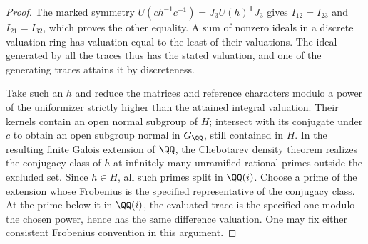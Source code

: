 \documentclass[a4paper,11pt]{article}
\theoremstyle{definition}
\theoremstyle{remark}
\numberwithin{equation}{section}
\begin{document}
\begin{proof}
The marked symmetry \(U(ch^{-1}c^{-1})=J_3 U(h)^{\mathsf T}J_3\) gives \(I_{12}=I_{23}\) and \(I_{21}=I_{32}\), which proves the other equality. A sum of nonzero ideals in a discrete valuation ring has valuation equal to the least of their valuations. The ideal generated by all the traces thus has the stated valuation, and one of the generating traces attains it by discreteness.

Take such an \(h\) and reduce the matrices and reference characters modulo a power of the uniformizer strictly higher than the attained integral valuation. Their kernels contain an open normal subgroup of \(H\); intersect with its conjugate under \(c\) to obtain an open subgroup normal in \(G_\QQ\), still contained in \(H\). In the resulting finite Galois extension of \(\QQ\), the Chebotarev density theorem realizes the conjugacy class of \(h\) at infinitely many unramified rational primes outside the excluded set. Since \(h\in H\), all such primes split in \(\QQ(i)\). Choose a prime of the extension whose Frobenius is the specified representative of the conjugacy class. At the prime below it in \(\QQ(i)\), the evaluated trace is the specified one modulo the chosen power, hence has the same difference valuation. One may fix either consistent Frobenius convention in this argument.
\end{proof}
\end{document}
